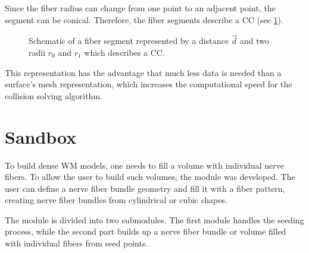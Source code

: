%
Since the fiber radius can change from one point to an adjacent point, the segment can be conical.
Therefore, the fiber segments describe a \ac{CC} (see \cref{fig:conical}).
\par
%
\begin{figure}[!t]
    \centering
    \setlength{\tikzwidth}{0.5\textwidth}
	\caption[]{Schematic of a fiber segment represented by a distance $\vec{d}$ and two radii $r_0$ and $r_1$ which describes a  \ac{CC}.}
	\label{fig:conical}
\end{figure}
%
This representation has the advantage that much less data is needed than a surface's mesh representation, which increases the computational speed for the collision solving algorithm.
%
% 
% 
\section{Sandbox}\label{sec:sandbox}
%
To build dense \ac{WM} models, one needs to fill a volume with individual nerve fibers.
To allow the user to build such volumes, the module  was developed.
The user can define a nerve fiber bundle geometry and fill it with a fiber pattern, creating nerve fiber bundles from cylindrical or cubic shapes.
\par
%
The module  is divided into two submodules.
The first module handles the seeding process, while the second part builds up a nerve fiber bundle or volume filled with individual fibers from seed points.
%
% 
% 
